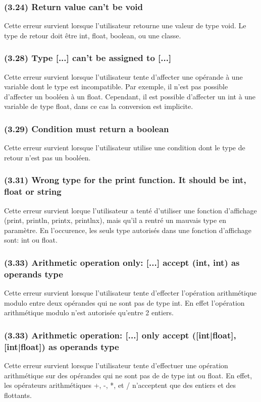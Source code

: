 \documentclass[12pt, a4paper, one side]{article}
\begin{document}
\subsubsection{(3.24) Return value can't be void}
Cette erreur survient lorsque l'utilisateur retourne une valeur de type void. Le type de retour doit être int, float, boolean, ou une classe.

\subsubsection{(3.28) Type [...] can't be assigned to [...]}
Cette erreur survient lorsque l'utilisateur tente d'affecter une opérande à une variable dont le type est incompatible. Par exemple, il n'est pas possible d'affecter un booléen à un float. Cependant, il est possible d'affecter un int à une variable de type float, dans ce cas la conversion est implicite.

\subsubsection{(3.29) Condition must return a boolean}
Cette erreur survient lorsque l'utilisateur utilise une condition dont le type de retour n'est pas un booléen.

\subsubsection{(3.31) Wrong type for the print function. It should be int, float or string}
Cette erreur survient lorque l'utilisateur a tenté d'utiliser une fonction d'affichage (print, println, printx, printlnx),
mais qu'il a rentré un mauvais type en paramètre. En l'occurence, les seuls type autorisés dans une
fonction d'affichage sont: int ou float.

\subsubsection{(3.33) Arithmetic operation only: [...] accept (int, int) as operands type}
Cette erreur survient lorsque l'utilisateur tente d'effecter l'opération arithmétique modulo entre deux opérandes qui ne sont pas de type int. En effet l'opération arithmétique modulo n'est autorisée qu'entre 2 entiers.

\subsubsection{(3.33) Arithmetic operation: [...] only accept ([int|float], [int|float]) as operands type}
Cette erreur survient lorsque l'utilisateur tente d'effectuer une opération arithmétique sur des opérandes qui ne sont pas de de type int ou float. En effet, les opérateurs arithmétiques +, -, *, et / n'acceptent que des entiers et des flottants.
\end{document}
